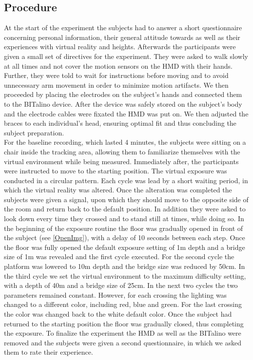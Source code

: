 \subsection{Procedure}
At the start of the experiment the subjects had to answer a short questionnaire concerning personal information, their general attitude towards as well as their experiences with virtual reality and heights. Afterwards the participants were given a small set of directives for the experiment. They were asked to walk slowly at all times and not cover the motion sensors on the HMD with their hands. Further, they were told to wait for instructions before moving and to avoid unnecessary arm movement in order to minimize motion artifacts. We then proceeded by placing the electrodes on the subject's hands and connected them to the BITalino device. After the device was safely stored on the subject's body and the electrode cables were fixated the HMD was put on. We then adjusted the braces to each individual's head, ensuring optimal fit and thus concluding the subject preparation.\\
For the baseline recording, which lasted 4 minutes, the subjects were sitting on a chair inside the tracking area, allowing them to familiarize themselves with the virtual environment while being measured. Immediately after, the participants were instructed to move to the starting position. The virtual exposure was conducted in a circular pattern. Each cycle was lead by a short waiting period, in which the virtual reality was altered. Once the alteration was completed the subjects were given a signal, upon which they should move to the opposite side of the room and return back to the default position. In addition they were asked to look down every time they crossed and to stand still at times, while doing so. In the beginning of the exposure routine the floor was gradually opened in front of the subject (see \ref{OpenImg}), with a delay of 10 seconds between each step. Once the floor was fully opened the default exposure setting of 1m depth and a bridge size of 1m was revealed and the first cycle executed. For the second cycle the platform was lowered to 10m depth and the bridge size was reduced by 50cm. In the third cycle we set the virtual environment to the maximum difficulty setting, with a depth of 40m and a bridge size of 25cm. In the next two cycles the two parameters remained constant. However, for each crossing the lighting was changed to a different color, including red, blue and green. For the last crossing the color was changed back to the white default color. Once the subject had returned to the starting position the floor was gradually closed, thus completing the exposure. To finalize the experiment the HMD as well as the BITalino were removed and the subjects were given a second questionnaire, in which we asked them to rate their experience.


